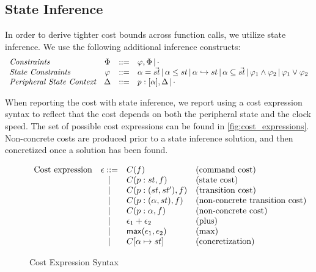 \subsection{State Inference}

In order to derive tighter cost bounds across function calls, we utilize state inference. We use the following additional inference constructs: 
\[
\begin{array}{lcll}
     \textit{Constraints} & \Phi & ::= & \varphi, \Phi \,|\, \cdot  \\
    \textit{State Constraints} & \varphi & ::= & \alpha = \Vec{st} \,|\, \alpha \leq st \,|\, \alpha \hookrightarrow st \,|\, \alpha \subseteq \Vec{st} \,|\, \varphi_1 \wedge \varphi_2 \,|\, \varphi_1 \vee \varphi_2 \\
    \textit{Peripheral State Context} & \Delta & ::= & p : [\alpha], \Delta \,|\, \cdot
\end{array}
\]

When reporting the cost with state inference, we report using a cost expression syntax to reflect that the cost depends on both the peripheral state and the clock speed. The set of possible cost expressions can be found in \autoref{fig:cost_expressions}. Non-concrete costs are produced prior to a state inference solution, and then concretized once a solution has been found.

\begin{figure}
\[
\begin{array}{lcll}
     \text{Cost expression} & \epsilon  ::= & C(f) & \text{(command cost)} \\ & \,|\, & C(p : st, f) & \text{(state cost)} \\ & \,|\, & C(p : (st, st'), f) & \text{(transition cost)} \\ & \,|\, & C(p : (\alpha, st), f) & \text{(non-concrete transition cost)} \\
     & \,|\, & C(p : \alpha, f) & \text{(non-concrete cost)} \\ & \,|\, & \epsilon_1 + \epsilon_2 & \text{(plus)} \\ & \,|\, & \mathsf{max}(\epsilon_1, \epsilon_2) & \text{(max)} \\ & \,|\, & C[\alpha \mapsto st] & \text{(concretization)}
\end{array}
\]
\caption{Cost Expression Syntax}
\label{fig:cost_expressions}
\end{figure}

